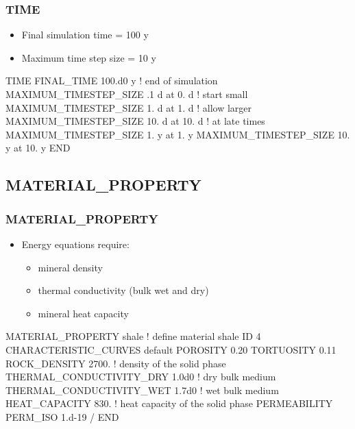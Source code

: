 \documentclass{beamer}
\newcommand\redcomment[1]{{{\color{red} #1}}}
\newcommand\bluecomment[1]{{{\color{blue} #1}}}
\newcommand\greencomment[1]{{{\color{green} #1}}}
\begin{document}
\begin{frame}[fragile]\frametitle{TIME}
\begin{itemize}
  \item \redcomment{Final} simulation \redcomment{time} = 100 y
  \item \redcomment{Maximum time step size} = 10 y
\end{itemize}

\begin{semiverbatim}

TIME
  FINAL_TIME 100.d0 y \bluecomment{! end of simulation}
  MAXIMUM_TIMESTEP_SIZE .1 d at 0. d \bluecomment{! start small}
  MAXIMUM_TIMESTEP_SIZE 1. d at 1. d \bluecomment{! allow larger}
  MAXIMUM_TIMESTEP_SIZE 10. d at 10. d \bluecomment{! at late times}
  MAXIMUM_TIMESTEP_SIZE 1. y at 1. y
  MAXIMUM_TIMESTEP_SIZE 10. y at 10. y
END
\end{semiverbatim}

\end{frame}

\subsection{MATERIAL\_PROPERTY}

\begin{frame}[fragile]\frametitle{MATERIAL\_PROPERTY}
\begin{itemize}
  \item Energy equations require:
  \begin{itemize}
    \item \redcomment{mineral density}
    \item \redcomment{thermal conductivity} (bulk wet and dry)
    \item \redcomment{mineral heat capacity}
  \end{itemize}
\end{itemize}

\begin{semiverbatim}\small
MATERIAL_PROPERTY shale \bluecomment{! define material} \greencomment{shale}
  ID 4
  CHARACTERISTIC_CURVES default
  POROSITY 0.20
  TORTUOSITY 0.11
  ROCK_DENSITY 2700. \bluecomment{! density of the solid phase}
  THERMAL_CONDUCTIVITY_DRY 1.0d0 \bluecomment{! dry bulk medium}
  THERMAL_CONDUCTIVITY_WET 1.7d0 \bluecomment{! wet bulk medium}
  HEAT_CAPACITY 830. \bluecomment{! heat capacity of the solid phase}
  PERMEABILITY
    PERM_ISO 1.d-19
  /
END
\end{semiverbatim}
\end{frame}
\end{document}
